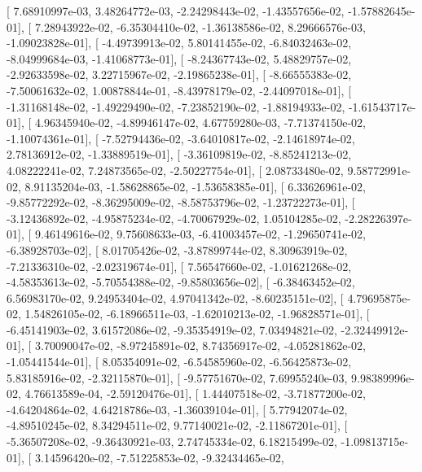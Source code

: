 \documentclass{article}
\begin{document}
       [  7.68910997e-03,   3.48264772e-03,  -2.24298443e-02,
         -1.43557656e-02,  -1.57882645e-01],
       [  7.28943922e-02,  -6.35304410e-02,  -1.36138586e-02,
          8.29666576e-03,  -1.09023828e-01],
       [ -4.49739913e-02,   5.80141455e-02,  -6.84032463e-02,
         -8.04999684e-03,  -1.41068773e-01],
       [ -8.24367743e-02,   5.48829757e-02,  -2.92633598e-02,
          3.22715967e-02,  -2.19865238e-01],
       [ -8.66555383e-02,  -7.50061632e-02,   1.00878844e-01,
         -8.43978179e-02,  -2.44097018e-01],
       [ -1.31168148e-02,  -1.49229490e-02,  -7.23852190e-02,
         -1.88194933e-02,  -1.61543717e-01],
       [  4.96345940e-02,  -4.89946147e-02,   4.67759280e-03,
         -7.71374150e-02,  -1.10074361e-01],
       [ -7.52794436e-02,  -3.64010817e-02,  -2.14618974e-02,
          2.78136912e-02,  -1.33889519e-01],
       [ -3.36109819e-02,  -8.85241213e-02,   4.08222241e-02,
          7.24873565e-02,  -2.50227754e-01],
       [  2.08733480e-02,   9.58772991e-02,   8.91135204e-03,
         -1.58628865e-02,  -1.53658385e-01],
       [  6.33626961e-02,  -9.85772292e-02,  -8.36295009e-02,
         -8.58753796e-02,  -1.23722273e-01],
       [ -3.12436892e-02,  -4.95875234e-02,  -4.70067929e-02,
          1.05104285e-02,  -2.28226397e-01],
       [  9.46149616e-02,   9.75608633e-03,  -6.41003457e-02,
         -1.29650741e-02,  -6.38928703e-02],
       [  8.01705426e-02,  -3.87899744e-02,   8.30963919e-02,
         -7.21336310e-02,  -2.02319674e-01],
       [  7.56547660e-02,  -1.01621268e-02,  -4.58353613e-02,
         -5.70554388e-02,  -9.85803656e-02],
       [ -6.38463452e-02,   6.56983170e-02,   9.24953404e-02,
          4.97041342e-02,  -8.60235151e-02],
       [  4.79695875e-02,   1.54826105e-02,  -6.18966511e-03,
         -1.62010213e-02,  -1.96828571e-01],
       [ -6.45141903e-02,   3.61572086e-02,  -9.35354919e-02,
          7.03494821e-02,  -2.32449912e-01],
       [  3.70090047e-02,  -8.97245891e-02,   8.74356917e-02,
         -4.05281862e-02,  -1.05441544e-01],
       [  8.05354091e-02,  -6.54585960e-02,  -6.56425873e-02,
          5.83185916e-02,  -2.32115870e-01],
       [ -9.57751670e-02,   7.69955240e-03,   9.98389996e-02,
          4.76613589e-04,  -2.59120476e-01],
       [  1.44407518e-02,  -3.71877200e-02,  -4.64204864e-02,
          4.64218786e-03,  -1.36039104e-01],
       [  5.77942074e-02,  -4.89510245e-02,   8.34294511e-02,
          9.77140021e-02,  -2.11867201e-01],
       [ -5.36507208e-02,  -9.36430921e-03,   2.74745334e-02,
          6.18215499e-02,  -1.09813715e-01],
       [  3.14596420e-02,  -7.51225853e-02,  -9.32434465e-02,
\end{document}
